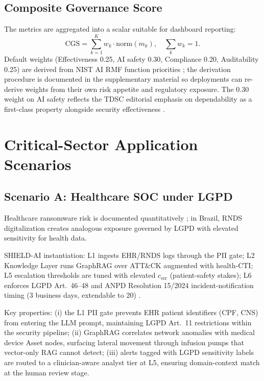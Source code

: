 \documentclass[journal]{IEEEtran}
\begin{document}
\subsection{Composite Governance Score}
The metrics are aggregated into a scalar suitable for dashboard reporting:
\begin{equation}
\text{CGS} = \sum_{k=1}^{K} w_k \cdot \text{norm}(m_k), \quad \sum_k w_k = 1.
\end{equation}
Default weights (Effectiveness 0.25, AI safety 0.30, Compliance 0.20, Auditability 0.25)
are derived from NIST AI RMF function priorities \cite{nist2023airmf,nist2024genai}; the
derivation procedure is documented in the supplementary material so deployments can re-derive
weights from their own risk appetite and regulatory exposure. The 0.30 weight on AI safety
reflects the TDSC editorial emphasis on dependability as a first-class property alongside
security effectiveness \cite{avizienis2004dependability}.

\section{Critical-Sector Application Scenarios}
\label{sec:scenarios}

\subsection{Scenario A: Healthcare SOC under LGPD}
Healthcare ransomware risk is documented quantitatively \cite{neprash2022ransomware,
jama2024ransomware,neprash2024changehealthcare}; in Brazil, RNDS digitalization creates
analogous exposure governed by LGPD with elevated sensitivity for health data.

SHIELD-AI instantiation: L1 ingests EHR/RNDS logs through the PII gate; L2 Knowledge Layer
runs GraphRAG over ATT\&CK augmented with health-CTI; L5 escalation thresholds are tuned with
elevated $c_{\text{err}}$ (patient-safety stakes); L6 enforces LGPD Art.~46--48 and ANPD
Resolution 15/2024 incident-notification timing (3 business days, extendable to 20)
\cite{anpd15}.

Key properties: (i) the L1 PII gate prevents EHR patient identifiers (CPF, CNS) from
entering the LLM prompt, maintaining LGPD Art.~11 restrictions within the security pipeline;
(ii) GraphRAG correlates network anomalies with medical device Asset nodes, surfacing lateral
movement through infusion pumps that vector-only RAG cannot detect; (iii) alerts tagged with
LGPD sensitivity labels are routed to a clinician-aware analyst tier at L5, ensuring
domain-context match at the human review stage.
\end{document}
